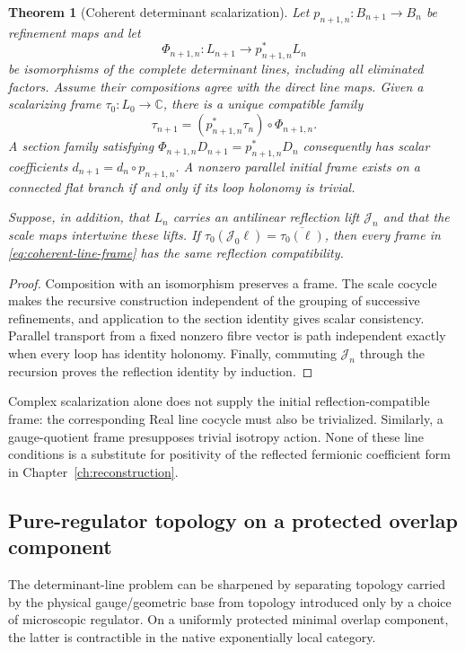 \documentclass[11pt,a4paper,oneside]{book}
\theoremstyle{plain}
\newtheorem{theorem}{Theorem}[chapter]
\theoremstyle{definition}
\theoremstyle{remark}
\newcommand{\C}{\mathbb C}
\newcommand{\src}[2]{\cite{#1}}
\begin{document}
\begin{theorem}[Coherent determinant scalarization]
\label{thm:coherent-line}
Let $p_{n+1,n}:B_{n+1}\to B_n$ be refinement maps and let
\[
 \Phi_{n+1,n}:L_{n+1}\longrightarrow p_{n+1,n}^{*}L_n
\]
be isomorphisms of the complete determinant lines, including all eliminated
factors.  Assume their compositions agree with the direct line maps.  Given
a scalarizing frame $\tau_0:L_0\to\C$, there is a unique compatible family
\begin{equation}
 \tau_{n+1}=(p_{n+1,n}^{*}\tau_n)\circ\Phi_{n+1,n}.
 \label{eq:coherent-line-frame}
\end{equation}
A section family satisfying
$\Phi_{n+1,n}D_{n+1}=p_{n+1,n}^{*}D_n$ consequently has scalar coefficients
$d_{n+1}=d_n\circ p_{n+1,n}$.  A nonzero parallel initial frame exists on a
connected flat branch if and only if its loop holonomy is trivial.

Suppose, in addition, that $L_n$ carries an antilinear reflection lift
$\mathcal J_n$ and that the scale maps intertwine these lifts.  If
$\tau_0(\mathcal J_0\ell)=\overline{\tau_0(\ell)}$, then every frame in
\eqref{eq:coherent-line-frame} has the same reflection compatibility.
\end{theorem}
\begin{proof}
Composition with an isomorphism preserves a frame.  The scale cocycle makes
the recursive construction independent of the grouping of successive
refinements, and application to the section identity gives scalar
consistency.  Parallel transport from a fixed nonzero fibre vector is
path independent exactly when every loop has identity holonomy.  Finally,
commuting $\mathcal J_n$ through the recursion proves the reflection
identity by induction.
\end{proof}
\src{R10}{thm:v97-flat-holonomy,thm:v97-projective-scalarization,prop:v97-reflection-frame}

Complex scalarization alone does not supply the initial reflection-compatible
frame: the corresponding Real line cocycle must also be trivialized.
Similarly, a gauge-quotient frame presupposes trivial isotropy action.  None
of these line conditions is a substitute for positivity of the reflected
fermionic coefficient form in Chapter~\ref{ch:reconstruction}.

\subsection{Pure-regulator topology on a protected overlap component}
The determinant-line problem can be sharpened by separating topology carried
by the physical gauge/geometric base from topology introduced only by a choice
of microscopic regulator.  On a uniformly protected minimal overlap component,
the latter is contractible in the native exponentially local category.
\end{document}
